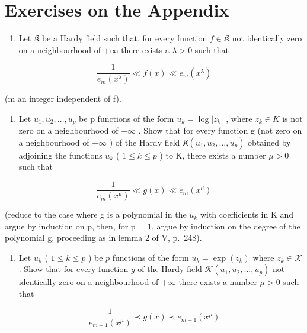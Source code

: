 \section*{Exercises on the Appendix}
{}

\begin{enumerate}
\def\labelenumi{\arabic{enumi})}
\tightlist
\item
  Let \(\mathfrak{K}\) be a Hardy field such that, for every function \(f\in \mathfrak{K}\) not identically zero on a neighbourhood of \(+\infty\) there exists a \(\lambda >0\) such that
\end{enumerate}

\[
\frac {1}{e _ {m} (x ^ {\lambda})} \ll f (x) \ll e _ {m} (x ^ {\lambda})
\]

(m an integer independent of f).

\begin{enumerate}
\def\labelenumi{\alph{enumi})}
\tightlist
\item
  Let \(u_{1}, u_{2}, \ldots, u_{p}\) be p functions of the form \(u_{k} = \log |z_{k}|\) , where \(z_{k} \in K\) is not zero on a neighbourhood of \(+\infty\) . Show that for every function g (not zero on a neighbourhood of \(+\infty\) ) of the Hardy field \(\mathfrak{K}(u_{1}, u_{2}, \ldots, u_{p})\) obtained by adjoining the functions \(u_{k}\) ( \(1 \leqslant k \leqslant p\) ) to K, there exists a number \(\mu > 0\) such that
\end{enumerate}

\[
\frac {1}{e _ {m} (x ^ {\mu})} \ll g (x) \ll e _ {m} (x ^ {\mu})
\]

(reduce to the case where g is a polynomial in the \(u_{k}\) with coefficients in K and argue by induction on p, then, for p = 1, argue by induction on the degree of the polynomial g, proceeding as in lemma 2 of V, p.~248).

\begin{enumerate}
\def\labelenumi{\alph{enumi})}
\setcounter{enumi}{1}
\tightlist
\item
  Let \(u_{k}\) ( \(1 \leqslant k \leqslant p\) ) be \(p\) functions of the form \(u_{k} = \exp(z_{k})\) where \(z_{k} \in \mathcal{K}\) . Show that for every function \(g\) of the Hardy field \(\mathcal{K}(u_{1}, u_{2}, \ldots, u_{p})\) not identically zero on a neighbourhood of \(+\infty\) there exists a number \(\mu > 0\) such that
\end{enumerate}

\[
\frac {1}{e _ {m + 1} (x ^ {\mu})} \prec g (x) \prec e _ {m + 1} (x ^ {\mu})
\]

